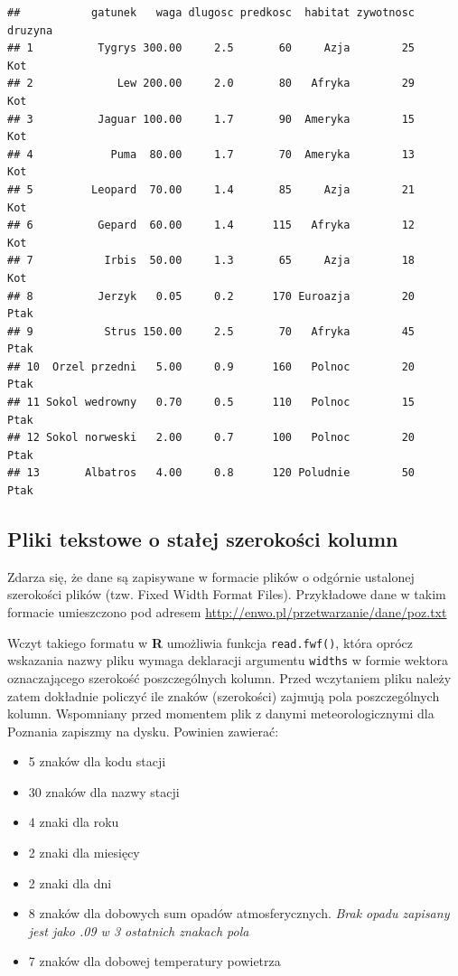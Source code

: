 \documentclass[]{book}
\providecommand{\tightlist}{%
  \setlength{\itemsep}{0pt}\setlength{\parskip}{0pt}}
\theoremstyle{definition}
\theoremstyle{definition}
\theoremstyle{definition}
\theoremstyle{remark}
\begin{document}
\begin{verbatim}
##           gatunek   waga dlugosc predkosc  habitat zywotnosc druzyna
## 1          Tygrys 300.00     2.5       60     Azja        25     Kot
## 2             Lew 200.00     2.0       80   Afryka        29     Kot
## 3          Jaguar 100.00     1.7       90  Ameryka        15     Kot
## 4            Puma  80.00     1.7       70  Ameryka        13     Kot
## 5         Leopard  70.00     1.4       85     Azja        21     Kot
## 6          Gepard  60.00     1.4      115   Afryka        12     Kot
## 7           Irbis  50.00     1.3       65     Azja        18     Kot
## 8          Jerzyk   0.05     0.2      170 Euroazja        20    Ptak
## 9           Strus 150.00     2.5       70   Afryka        45    Ptak
## 10  Orzel przedni   5.00     0.9      160   Polnoc        20    Ptak
## 11 Sokol wedrowny   0.70     0.5      110   Polnoc        15    Ptak
## 12 Sokol norweski   2.00     0.7      100   Polnoc        20    Ptak
## 13       Albatros   4.00     0.8      120 Poludnie        50    Ptak
\end{verbatim}

\subsection{Pliki tekstowe o stałej szerokości
kolumn}\label{pliki-tekstowe-o-staej-szerokosci-kolumn}

Zdarza się, że dane są zapisywane w formacie plików o odgórnie ustalonej
szerokości plików (tzw. Fixed Width Format Files). Przykładowe dane w
takim formacie umieszczono pod adresem
\url{http://enwo.pl/przetwarzanie/dane/poz.txt}

Wczyt takiego formatu w \textbf{R} umożliwia funkcja
\texttt{read.fwf()}, która oprócz wskazania nazwy pliku wymaga
deklaracji argumentu \texttt{widths} w formie wektora oznaczającego
szerokość poszczególnych kolumn. Przed wczytaniem pliku należy zatem
dokładnie policzyć ile znaków (szerokości) zajmują pola poszczególnych
kolumn. Wspomniany przed momentem plik z danymi meteorologicznymi dla
Poznania zapiszmy na dysku. Powinien zawierać:

\begin{itemize}
\tightlist
\item
  5 znaków dla kodu stacji
\item
  30 znaków dla nazwy stacji
\item
  4 znaki dla roku
\item
  2 znaki dla miesięcy
\item
  2 znaki dla dni
\item
  8 znaków dla dobowych sum opadów atmosferycznych. \emph{Brak opadu
  zapisany jest jako .09 w 3 ostatnich znakach pola}
\item
  7 znaków dla dobowej temperatury powietrza
\end{itemize}
\end{document}
